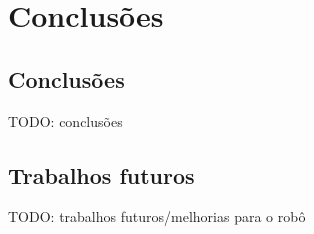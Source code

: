 \chapter{Conclusões}

\section{Conclusões}

TODO: conclusões

\section{Trabalhos futuros}

TODO: trabalhos futuros/melhorias para o robô

